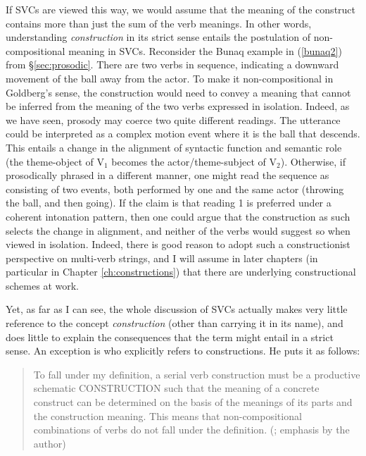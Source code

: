 If SVCs are viewed this way, we would assume that the meaning of the construct contains more than just the sum of the verb meanings. In other words, understanding \textit{construction} in its strict sense entails the postulation of non-compositional meaning in SVCs. Reconsider the Bunaq example in (\ref{bunaq2}) from §\ref{sec:prosodic}. There are two verbs in sequence, indicating a downward movement of the ball away from the actor. To make it non-compositional in Goldberg's sense, the construction would need to convey a meaning that cannot be inferred from the meaning of the two verbs expressed in isolation. Indeed, as we have seen, prosody may coerce two quite different readings. The utterance could be interpreted as a complex motion event where it is the ball that descends. This entails a change in the alignment of syntactic function and semantic role (the theme-object of V$_1$ becomes the actor/theme-subject of V$_2$). Otherwise, if prosodically phrased in a different manner, one might read the sequence as consisting of two events, both performed by one and the same actor (throwing the ball, and then going). If the claim is that reading 1 is preferred under a coherent intonation pattern, then one could argue that the construction as such selects the change in alignment, and neither of the verbs would suggest so when viewed in isolation. Indeed, there is good reason to adopt such a constructionist perspective on multi-verb strings, and I will assume in later chapters (in particular in Chapter \ref{ch:constructions}) that there are underlying constructional schemes at work.

Yet, as far as I can see, the whole discussion of SVCs actually makes very little reference to the concept \textit{construction} (other than carrying it in its name), and does little to explain the consequences that the term might entail in a strict sense. An exception is \citet{haspelmath2016serial} who explicitly refers to constructions. He puts it as follows:

\begin{quote}To fall under my definition, a serial verb construction must be a productive schematic
CONSTRUCTION such that the meaning of a concrete construct can be determined on the basis of the meanings of its parts and the construction meaning. This means that non-compositional combinations of verbs do not fall under the definition. (\citealt[6]{haspelmath2016serial}; emphasis by the author) \end{quote}


